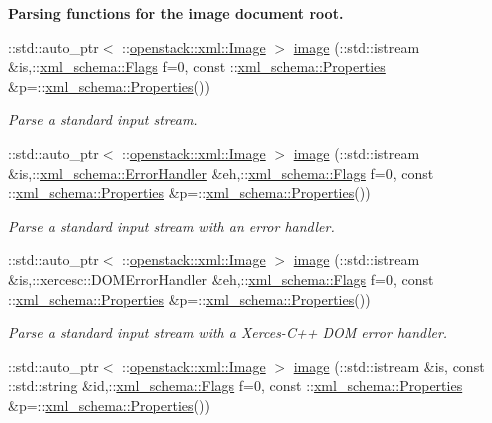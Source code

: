 \begin{Indent}{\bf Parsing functions for the image document root.}
\begin{DoxyCompactItemize}
::std::auto\_\-ptr$<$ ::\hyperlink{classopenstack_1_1xml_1_1Image}{openstack::xml::Image} $>$ \hyperlink{namespaceopenstack_1_1xml_a7ada0396867ca87e92ec3b13721ce95d}{image} (::std::istream \&is,::\hyperlink{namespacexml__schema_affb4c227cbd9aa7453dd1dc5a1401943}{xml\_\-schema::Flags} f=0, const ::\hyperlink{namespacexml__schema_ad27ce19a7ee1d3b1064092648898f64c}{xml\_\-schema::Properties} \&p=::\hyperlink{namespacexml__schema_ad27ce19a7ee1d3b1064092648898f64c}{xml\_\-schema::Properties}())
\begin{DoxyCompactList}\small\item\em Parse a standard input stream. \item\end{DoxyCompactList}\item 
::std::auto\_\-ptr$<$ ::\hyperlink{classopenstack_1_1xml_1_1Image}{openstack::xml::Image} $>$ \hyperlink{namespaceopenstack_1_1xml_a287afdd98982450f28a591856c0d4ca0}{image} (::std::istream \&is,::\hyperlink{namespacexml__schema_ab1c9361bfd3b404eaabf0c31eded79dc}{xml\_\-schema::ErrorHandler} \&eh,::\hyperlink{namespacexml__schema_affb4c227cbd9aa7453dd1dc5a1401943}{xml\_\-schema::Flags} f=0, const ::\hyperlink{namespacexml__schema_ad27ce19a7ee1d3b1064092648898f64c}{xml\_\-schema::Properties} \&p=::\hyperlink{namespacexml__schema_ad27ce19a7ee1d3b1064092648898f64c}{xml\_\-schema::Properties}())
\begin{DoxyCompactList}\small\item\em Parse a standard input stream with an error handler. \item\end{DoxyCompactList}\item 
::std::auto\_\-ptr$<$ ::\hyperlink{classopenstack_1_1xml_1_1Image}{openstack::xml::Image} $>$ \hyperlink{namespaceopenstack_1_1xml_a5692563c46d9748906a657fff819e43b}{image} (::std::istream \&is,::xercesc::DOMErrorHandler \&eh,::\hyperlink{namespacexml__schema_affb4c227cbd9aa7453dd1dc5a1401943}{xml\_\-schema::Flags} f=0, const ::\hyperlink{namespacexml__schema_ad27ce19a7ee1d3b1064092648898f64c}{xml\_\-schema::Properties} \&p=::\hyperlink{namespacexml__schema_ad27ce19a7ee1d3b1064092648898f64c}{xml\_\-schema::Properties}())
\begin{DoxyCompactList}\small\item\em Parse a standard input stream with a Xerces-\/C++ DOM error handler. \item\end{DoxyCompactList}\item 
::std::auto\_\-ptr$<$ ::\hyperlink{classopenstack_1_1xml_1_1Image}{openstack::xml::Image} $>$ \hyperlink{namespaceopenstack_1_1xml_a25a5e0c0f9c32e863824ee7b06a6fc62}{image} (::std::istream \&is, const ::std::string \&id,::\hyperlink{namespacexml__schema_affb4c227cbd9aa7453dd1dc5a1401943}{xml\_\-schema::Flags} f=0, const ::\hyperlink{namespacexml__schema_ad27ce19a7ee1d3b1064092648898f64c}{xml\_\-schema::Properties} \&p=::\hyperlink{namespacexml__schema_ad27ce19a7ee1d3b1064092648898f64c}{xml\_\-schema::Properties}())

\end{DoxyCompactItemize}
\end{Indent}

